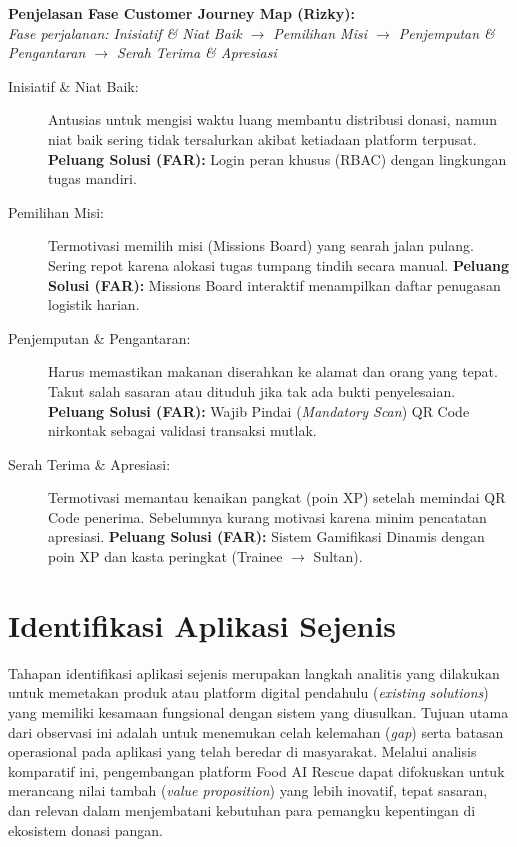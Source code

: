 \textbf{Penjelasan Fase Customer Journey Map (Rizky):} \\
\textit{Fase perjalanan: Inisiatif \& Niat Baik $\rightarrow$ Pemilihan Misi $\rightarrow$ Penjemputan \& Pengantaran $\rightarrow$ Serah Terima \& Apresiasi}
\begin{description}
    \item[Inisiatif \& Niat Baik:] Antusias untuk mengisi waktu luang membantu distribusi donasi, namun niat baik sering tidak tersalurkan akibat ketiadaan platform terpusat. \textbf{Peluang Solusi (FAR):} Login peran khusus (RBAC) dengan lingkungan tugas mandiri.
    \item[Pemilihan Misi:] Termotivasi memilih misi (Missions Board) yang searah jalan pulang. Sering repot karena alokasi tugas tumpang tindih secara manual. \textbf{Peluang Solusi (FAR):} Missions Board interaktif menampilkan daftar penugasan logistik harian.
    \item[Penjemputan \& Pengantaran:] Harus memastikan makanan diserahkan ke alamat dan orang yang tepat. Takut salah sasaran atau dituduh jika tak ada bukti penyelesaian. \textbf{Peluang Solusi (FAR):} Wajib Pindai (\textit{Mandatory Scan}) QR Code nirkontak sebagai validasi transaksi mutlak.
    \item[Serah Terima \& Apresiasi:] Termotivasi memantau kenaikan pangkat (poin XP) setelah memindai QR Code penerima. Sebelumnya kurang motivasi karena minim pencatatan apresiasi. \textbf{Peluang Solusi (FAR):} Sistem Gamifikasi Dinamis dengan poin XP dan kasta peringkat (Trainee $\rightarrow$ Sultan).
\end{description}

\section{Identifikasi Aplikasi Sejenis}
\par Tahapan identifikasi aplikasi sejenis merupakan langkah analitis yang dilakukan untuk memetakan produk atau platform digital pendahulu (\textit{existing solutions}) yang memiliki kesamaan fungsional dengan sistem yang diusulkan. Tujuan utama dari observasi ini adalah untuk menemukan celah kelemahan (\textit{gap}) serta batasan operasional pada aplikasi yang telah beredar di masyarakat. Melalui analisis komparatif ini, pengembangan platform Food AI Rescue dapat difokuskan untuk merancang nilai tambah (\textit{value proposition}) yang lebih inovatif, tepat sasaran, dan relevan dalam menjembatani kebutuhan para pemangku kepentingan di ekosistem donasi pangan.

